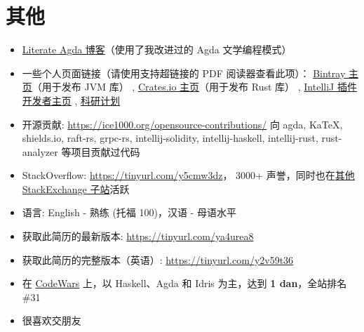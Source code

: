 \documentclass{resume}
\begin{document}

\section{其他}
\begin{itemize}[parsep=0.25ex]
  \item \href{https://ice1000.org/lagda/}{Literate Agda 博客}（使用了我改进过的 Agda 文学编程模式）
  \item 一些个人页面链接（请使用支持超链接的 PDF 阅读器查看此项）：
    \href{https://bintray.com/ice1000}{Bintray 主页}（用于发布 JVM 库）
  , \href{https://crates.io/users/ice1000}{Crates.io 主页}（用于发布 Rust 库）
  , \href{https://plugins.jetbrains.com/author/10a216dd-c558-4aaf-aa8a-723f431452fb}
    {IntelliJ 插件开发者主页}
  , \href{https://personal.psu.edu/yqz5714/}{科研计划}
  \item 开源贡献: \url{https://ice1000.org/opensource-contributions/}
    向 \textsf{agda, KaTeX, shields.io, raft-rs, grpc-rs, intellij-solidity,
      intellij-haskell, intellij-rust, rust-analyzer} 等项目贡献过代码
  \item StackOverflow: \url{https://tinyurl.com/y5cmw3dz}，
    3000+ 声誉，同时也在\href{https://stackexchange.com/users/9532102/} {其他 StackExchange 子站}活跃
  \item 语言: English - 熟练 (托福 100)，汉语 - 母语水平
  \item 获取此简历的最新版本: \url{https://tinyurl.com/ya4urea8}
  \item 获取此简历的完整版本（英语）: \url{https://tinyurl.com/y2v59t36}
  \item 在
    \href{https://www.codewars.com/users/ice1000} {CodeWars}
    上，以 Haskell、Agda 和 Idris 为主，达到 \textbf{1 dan}，全站排名 \#31
  \item 很喜欢交朋友
\end{itemize}

%
%
\end{document}
